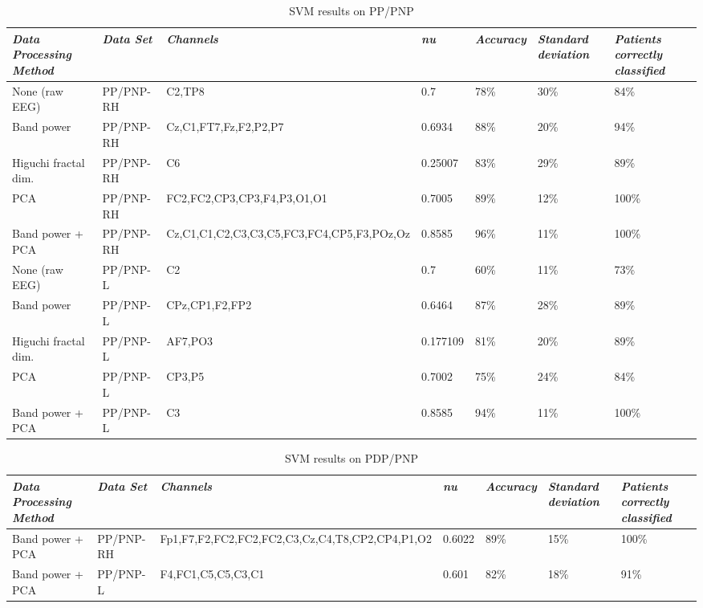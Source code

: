 \documentclass{mpaper}
\begin{document}
\begin{table}
\hspace*{-1cm}
\begin{tabular}{p{3.2cm}|l|p{6.9cm}|l||p{1.1cm}|p{1.2cm}|p{1.5cm}}
\hline
\emph{Data Processing Method} & \emph{Data Set} & \emph{Channels} & \emph{nu} & \emph{Accuracy} & \emph{Standard deviation} & \emph{Patients correctly classified}  \\ \hline \hline
None (raw EEG) & PP/PNP-RH & C2,TP8 & 0.7 & 78\% & 30\% & 84\% \\ \hline
Band power & PP/PNP-RH & Cz,C1,FT7,Fz,F2,P2,P7 & 0.6934 & 88\% & 20\% & 94\% \\ \hline
Higuchi fractal dim. & PP/PNP-RH & C6 & 0.25007 & 83\% & 29\% & 89\% \\ \hline
PCA & PP/PNP-RH & FC2,FC2,CP3,CP3,F4,P3,O1,O1 & 0.7005 & 89\% & 12\% & 100\% \\ \hline
Band power + PCA & PP/PNP-RH & Cz,C1,C1,C2,C3,C3,C5,FC3,FC4,CP5,F3,POz,Oz & 0.8585 & 96\% & 11\% & 100\% \\ \hline

None (raw EEG) & PP/PNP-L & C2 & 0.7 & 60\% & 11\% & 73\%\\ \hline
Band power & PP/PNP-L & CPz,CP1,F2,FP2 & 0.6464 & 87\% & 28\% & 89\%\\ \hline
Higuchi fractal dim. & PP/PNP-L & AF7,PO3 & 0.177109 & 81\% & 20\% & 89\%\\ \hline
PCA & PP/PNP-L & CP3,P5 & 0.7002 & 75\% & 24\% & 84\%\\ \hline
Band power + PCA & PP/PNP-L & C3 & 0.8585 & 94\% & 11\% & 100\%\\ \hline

\end{tabular}
\caption{\label{results-svm}SVM results on PP/PNP}
\end{table}

\begin{table}
\hspace*{-1.2cm}
\begin{tabular}{p{3cm}|l|p{7.7cm}|l||p{1.1cm}|p{1.2cm}|p{1.5cm}}
\hline
\emph{Data Processing Method} & \emph{Data Set} & \emph{Channels} & \emph{nu} & \emph{Accuracy} & \emph{Standard deviation} & \emph{Patients correctly classified}  \\ \hline \hline
Band power + PCA & PP/PNP-RH & Fp1,F7,F2,FC2,FC2,FC2,C3,Cz,C4,T8,CP2,CP4,P1,O2 & 0.6022 & 89\% & 15\% & 100\% \\ \hline
Band power + PCA & PP/PNP-L & F4,FC1,C5,C5,C3,C1 & 0.601 & 82\% & 18\% & 91\%\\ \hline

\end{tabular}
\caption{\label{results-pdp}SVM results on PDP/PNP}
\end{table}
\end{document}
